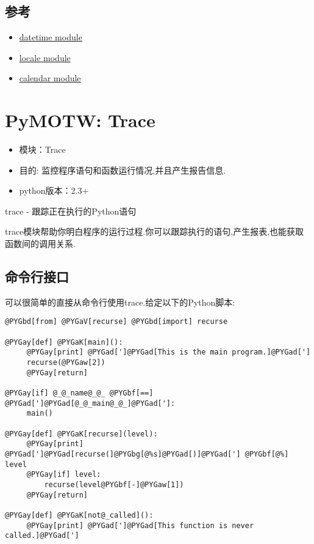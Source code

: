 \documentclass[letterpaper,10pt,english]{manual}
\begin{document}
\subsection{参考}
\begin{itemize}
\item {} 
\href{http://docs.python.org/lib/module-datetime.html}{datetime module}

\item {} 
\href{http://docs.python.org/lib/module-locale.html}{locale module}

\item {} 
\href{http://docs.python.org/lib/module-calendar.html}{calendar module}

\end{itemize}

\resetcurrentobjects


\section{PyMOTW: Trace}
\begin{itemize}
\item {} 
模块：Trace

\item {} 
目的: 监控程序语句和函数运行情况,并且产生报告信息.

\item {} 
python版本：2.3+

\end{itemize}

trace - 跟踪正在执行的Python语句

trace模块帮助你明白程序的运行过程.你可以跟踪执行的语句,产生报表,也能获取函数间的调用关系.


\subsection{命令行接口}

可以很简单的直接从命令行使用trace.给定以下的Python脚本:

\begin{Verbatim}[commandchars=@\[\]]
@PYGbd[from] @PYGaV[recurse] @PYGbd[import] recurse

@PYGay[def] @PYGaK[main]():
     @PYGay[print] @PYGad[']@PYGad[This is the main program.]@PYGad[']
     recurse(@PYGaw[2])
     @PYGay[return]

@PYGay[if] @_@_name@_@_ @PYGbf[==] @PYGad[']@PYGad[@_@_main@_@_]@PYGad[']:
     main()

@PYGay[def] @PYGaK[recurse](level):
     @PYGay[print] @PYGad[']@PYGad[recurse(]@PYGbg[@%s]@PYGad[)]@PYGad['] @PYGbf[@%] level
     @PYGay[if] level:
         recurse(level@PYGbf[-]@PYGaw[1])
     @PYGay[return]

@PYGay[def] @PYGaK[not@_called]():
     @PYGay[print] @PYGad[']@PYGad[This function is never called.]@PYGad[']
\end{Verbatim}
\end{document}
